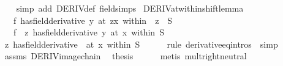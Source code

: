 \begin{isabellebody}
%
\isadelimproof
\ \ %
\endisadelimproof
%
\isatagproof
{}\isamarkupfalse%
\ {\isacharparenleft}{\kern0pt}simp\ add{\isacharcolon}{\kern0pt}\ DERIV{\isacharunderscore}{\kern0pt}def\ field{\isacharunderscore}{\kern0pt}simps{\isacharparenright}{\kern0pt}%
\endisatagproof
{\isafoldproof}%
%
\isadelimproof
\isanewline
%
\endisadelimproof
\isanewline
{}\isamarkupfalse%
\ DERIV{\isacharunderscore}{\kern0pt}at{\isacharunderscore}{\kern0pt}within{\isacharunderscore}{\kern0pt}shift{\isacharunderscore}{\kern0pt}lemma{\isacharcolon}{\kern0pt}\isanewline
\ \ \ {\isachardoublequoteopen}{\isacharparenleft}{\kern0pt}f\ has{\isacharunderscore}{\kern0pt}field{\isacharunderscore}{\kern0pt}derivative\ y{\isacharparenright}{\kern0pt}\ {\isacharparenleft}{\kern0pt}at\ {\isacharparenleft}{\kern0pt}z{\isacharplus}{\kern0pt}x{\isacharparenright}{\kern0pt}\ within\ {\isacharparenleft}{\kern0pt}{\isacharplus}{\kern0pt}{\isacharparenright}{\kern0pt}\ z\ {\isacharbackquote}{\kern0pt}\ S{\isacharparenright}{\kern0pt}{\isachardoublequoteclose}\isanewline
\ \ \ {\isachardoublequoteopen}{\isacharparenleft}{\kern0pt}f\ {\isasymcirc}\ {\isacharparenleft}{\kern0pt}{\isacharplus}{\kern0pt}{\isacharparenright}{\kern0pt}z\ has{\isacharunderscore}{\kern0pt}field{\isacharunderscore}{\kern0pt}derivative\ y{\isacharparenright}{\kern0pt}\ {\isacharparenleft}{\kern0pt}at\ x\ within\ S{\isacharparenright}{\kern0pt}{\isachardoublequoteclose}\isanewline
%
\isadelimproof
%
\endisadelimproof
%
\isatagproof
{}\isamarkupfalse%
\ {\isacharminus}{\kern0pt}\isanewline
\ \ \isamarkupfalse%
\ {\isachardoublequoteopen}{\isacharparenleft}{\kern0pt}{\isacharparenleft}{\kern0pt}{\isacharplus}{\kern0pt}{\isacharparenright}{\kern0pt}z\ has{\isacharunderscore}{\kern0pt}field{\isacharunderscore}{\kern0pt}derivative\ {}{\isacharparenright}{\kern0pt}\ {\isacharparenleft}{\kern0pt}at\ x\ within\ S{\isacharparenright}{\kern0pt}{\isachardoublequoteclose}\isanewline
\ \ \ \ \isamarkupfalse%
\ {\isacharparenleft}{\kern0pt}rule\ derivative{\isacharunderscore}{\kern0pt}eq{\isacharunderscore}{\kern0pt}intros\ {\isacharbar}{\kern0pt}\ simp{\isacharparenright}{\kern0pt}{\isacharplus}{\kern0pt}\isanewline
\ \ \isamarkupfalse%
\ assms\ DERIV{\isacharunderscore}{\kern0pt}image{\isacharunderscore}{\kern0pt}chain\ \isamarkupfalse%
\ {\isacharquery}{\kern0pt}thesis\isanewline
\ \ \ \ \isamarkupfalse%
\ {\isacharparenleft}{\kern0pt}metis\ mult{\isachardot}{\kern0pt}right{\isacharunderscore}{\kern0pt}neutral{\isacharparenright}{\kern0pt}\isanewline

\end{isabellebody}
